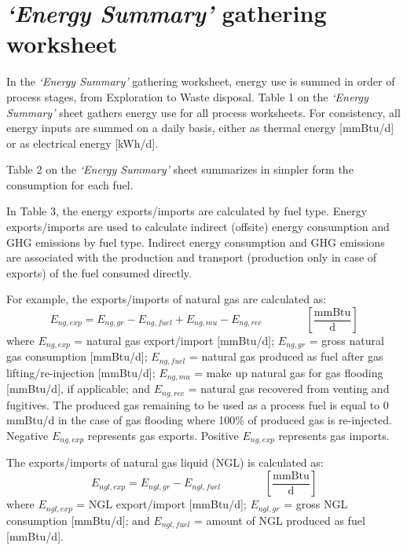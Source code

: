 \documentclass[11pt]{report}
\newcommand{\sheet}[1]{\textit{`{#1}'}}
\newcommand{\eqnunitfrac}[2]{\quad\quad \scriptstyle{\left[\frac{\text{#1}}{\text{#2}}\right]}}
\begin{document}
\clearpage

\section{\sheet{Energy Summary} gathering worksheet}\label{sec:energy_consumption}

In the \sheet{Energy Summary} gathering worksheet, energy use is summed in order of process stages, from Exploration to Waste disposal. Table 1 on the \sheet{Energy Summary} sheet gathers energy use for all process worksheets. For consistency, all energy inputs are summed on a daily basis, either as thermal energy [mmBtu/d] or as electrical energy [kWh/d]. 

Table 2 on the \sheet{Energy Summary} sheet summarizes in simpler form the consumption for each fuel. 

In Table 3, the energy exports/imports are calculated by fuel type. Energy exports/imports are used to calculate indirect (offsite) energy consumption and GHG emissions by fuel type. Indirect energy consumption and GHG emissions are associated with the production and transport (production only in case of exports) of the fuel consumed directly. 

For example, the exports/imports of natural gas are calculated as: 
\begin{equation}
E_{ng,exp} = E_{ng,gr} - E_{ng,fuel} + E_{ng,mu} - E_{ng,rec} \quad\quad\eqnunitfrac{mmBtu}{d}
\end{equation}
where $E_{ng,exp}$ = natural gas export/import [mmBtu/d]; $E_{ng,gr}$ = gross natural gas consumption [mmBtu/d]; $E_{ng,fuel}$ = natural gas produced as fuel after gas lifting/re-injection [mmBtu/d]; $E_{ng,mu}$ = make up natural gas for gas flooding [mmBtu/d], if applicable; and $E_{ng,rec}$ = natural gas recovered from venting and fugitives. The produced gas remaining to be used as a process fuel is equal to 0 mmBtu/d in the case of gas flooding where 100\% of produced gas is re-injected. Negative $E_{ng,exp}$ represents gas exports. Positive $E_{ng,exp}$ represents gas imports.

The exports/imports of natural gas liquid (NGL) is calculated as:
\begin{equation}
E_{ngl,exp} = E_{ngl,gr} - E_{ngl,fuel} \quad\quad\eqnunitfrac{mmBtu}{d}
\end{equation}
where $E_{ngl,exp}$ = NGL export/import [mmBtu/d]; $E_{ngl,gr}$ = gross NGL consumption [mmBtu/d]; and $E_{ngl,fuel}$ = amount of NGL produced as fuel [mmBtu/d]. 
\end{document}
